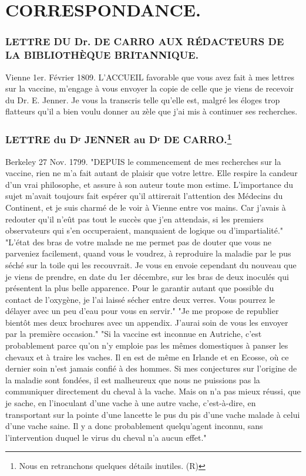 \setcounter{page}{187}
\chapter{CORRESPONDANCE.}
\subsection{LETTRE DU Dr. DE CARRO AUX RÉDACTEURS DE LA BIBLIOTHÈQUE BRITANNIQUE.}
Vienne 1er. Février 1809.
L'ACCUEIL favorable que vous avez fait à mes lettres sur la vaccine, m'engage à vous envoyer la copie de celle que je viens de recevoir du Dr. E. Jenner. Je vous la transcris telle qu'elle est, malgré les éloges trop flatteurs qu'il a bien voulu donner au zèle que j'ai mis à continuer ses recherches.
\setcounter{page}{188}

\subsection{LETTRE du Dʳ JENNER au Dʳ DE CARRO.\footnote{Nous en retranchons quelques détails inutiles. (R)}}
Berkeley 27 Nov. 1799.
"DEPUIS le commencement de mes recherches sur la vaccine, rien ne m'a fait autant de plaisir que votre lettre. Elle respire la candeur d'un vrai philosophe, et assure à son auteur toute mon estime. L'importance du sujet m'avait toujours fait espérer qu'il attirerait l'attention des Médecins du Continent, et je suis charmé de le voir à Vienne entre vos mains. Car j'avais à redouter qu'il n'eût pas tout le succès que j'en attendais, si les premiers observateurs qui s'en occuperaient, manquaient de logique ou d'impartialité."
"L'état des bras de votre malade ne me permet pas de douter que vous ne parveniez facilement, quand vous le voudrez, à reproduire la maladie par le pus séché sur la toile qui les recouvrait. Je vous en envoie cependant du nouveau que je viens de prendre, en date du 1er décembre, sur les bras de deux inoculés qui présentent la plus belle apparence. Pour le garantir autant que possible du contact de l'oxygène, je l'ai laissé sécher entre\setcounter{page}{189} deux verres. Vous pourrez le délayer avec un peu d'eau pour vous en servir."
"Je me propose de republier bientôt mes deux brochures avec un appendix. J'aurai soin de vous les envoyer par la première occasion."
"Si la vaccine est inconnue en Autriche, c'est probablement parce qu'on n'y emploie pas les mêmes domestiques à panser les chevaux et à traire les vaches. Il en est de même en Irlande et en Ecosse, où ce dernier soin n'est jamais confié à des hommes. Si mes conjectures sur l'origine de la maladie sont fondées, il est malheureux que nous ne puissions pas la communiquer directement du cheval à la vache. Mais on n'a pas mieux réussi, que je sache, en l'inoculant d'une vache à une autre vache, c'est-à-dire, en transportant sur la pointe d'une lancette le pus du pis d'une vache malade à celui d'une vache saine. Il y a donc probablement quelqu'agent inconnu, sans l'intervention duquel le virus du cheval n'a aucun effet."
